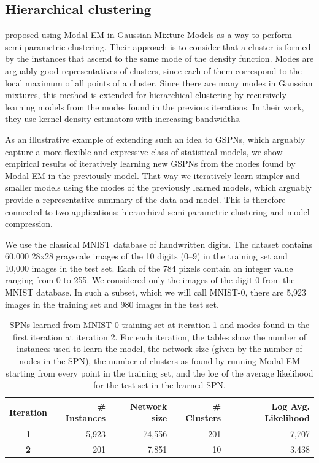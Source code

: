 \documentclass[12pt]{article}
\begin{document}
\subsection{Hierarchical clustering}
\label{subsec:clustering}

\cite{Li2007} proposed using Modal EM in  Gaussian Mixture Models as a way to perform semi-parametric clustering. Their approach is to consider that a cluster is formed by the instances that ascend to the same mode of the density function. Modes are arguably good representatives of clusters, since each of them correspond to the local maximum of all points of a cluster. Since there are many modes in Gaussian mixtures, this method is extended for hierarchical clustering by recursively learning models from the modes found in the previous iterations. In their work, they use kernel density estimators with increasing bandwidths.

As an illustrative example of extending such an idea to GSPNs, which arguably capture a more flexible and expressive class of statistical models, we show empirical results of iteratively learning new GSPNs from the modes found by Modal EM in the previously model. That way we iteratively learn simpler and smaller models using the modes of the previously learned models, which arguably provide a representative summary of the data and model. This is therefore connected to two applications: hierarchical semi-parametric clustering and model compression.

We use the classical MNIST database of handwritten digits. The dataset contains 60,000 28x28 grayscale images of the 10 digits (0--9) in the training set and 10,000 images in the test set. Each of the 784 pixels contain an integer value ranging from 0 to 255. We considered only the images of the digit 0 from the MNIST database. In such a subset, which we will call MNIST-0, there are 5,923 images in the training set and 980 images in the test set.

\begin{table}
    \centering
    \caption{SPNs learned from MNIST-0 training set at iteration 1 and modes found in the first iteration at iteration 2. For each iteration, the tables show the number of instances used to learn the model, the network size (given by the number of nodes in the SPN), the number of clusters as found by running Modal EM starting from every point in the training set, and the log of the average likelihood for the test set in the learned SPN.}
    \label{tab:experiments}
    \begin{tabular}{|c|r|r|r|r|}
        \hline
        \textbf{Iteration} & \textbf{\# Instances} & \textbf{Network size} & \textbf{\# Clusters} & \textbf{Log Avg. Likelihood} \\ \hline
        \textbf{1} & 5,923 & 74,556 & 201 & ~7,707 \\
        \textbf{2} & 201 & 7,851 & 10 & ~3,438 \\
        \hline
    \end{tabular}
\end{table}
\end{document}
